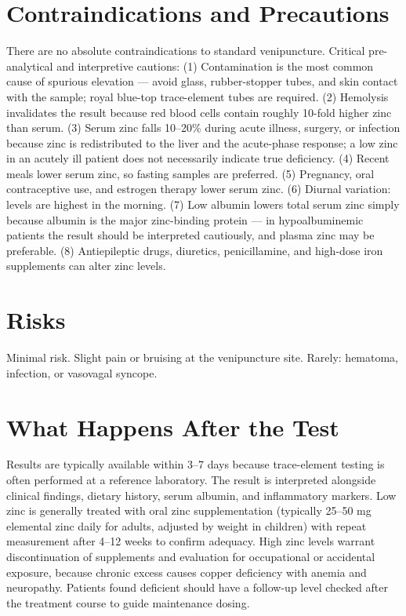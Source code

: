 \section*{Contraindications and Precautions}
There are no absolute contraindications to standard venipuncture. Critical pre-analytical and interpretive cautions: (1) Contamination is the most common cause of spurious elevation --- avoid glass, rubber-stopper tubes, and skin contact with the sample; royal blue-top trace-element tubes are required. (2) Hemolysis invalidates the result because red blood cells contain roughly 10-fold higher zinc than serum. (3) Serum zinc falls 10--20\% during acute illness, surgery, or infection because zinc is redistributed to the liver and the acute-phase response; a low zinc in an acutely ill patient does not necessarily indicate true deficiency. (4) Recent meals lower serum zinc, so fasting samples are preferred. (5) Pregnancy, oral contraceptive use, and estrogen therapy lower serum zinc. (6) Diurnal variation: levels are highest in the morning. (7) Low albumin lowers total serum zinc simply because albumin is the major zinc-binding protein --- in hypoalbuminemic patients the result should be interpreted cautiously, and plasma zinc may be preferable. (8) Antiepileptic drugs, diuretics, penicillamine, and high-dose iron supplements can alter zinc levels.

\section*{Risks}
Minimal risk. Slight pain or bruising at the venipuncture site. Rarely: hematoma, infection, or vasovagal syncope.

\section*{What Happens After the Test}
Results are typically available within 3--7 days because trace-element testing is often performed at a reference laboratory. The result is interpreted alongside clinical findings, dietary history, serum albumin, and inflammatory markers. Low zinc is generally treated with oral zinc supplementation (typically 25--50 mg elemental zinc daily for adults, adjusted by weight in children) with repeat measurement after 4--12 weeks to confirm adequacy. High zinc levels warrant discontinuation of supplements and evaluation for occupational or accidental exposure, because chronic excess causes copper deficiency with anemia and neuropathy. Patients found deficient should have a follow-up level checked after the treatment course to guide maintenance dosing.

